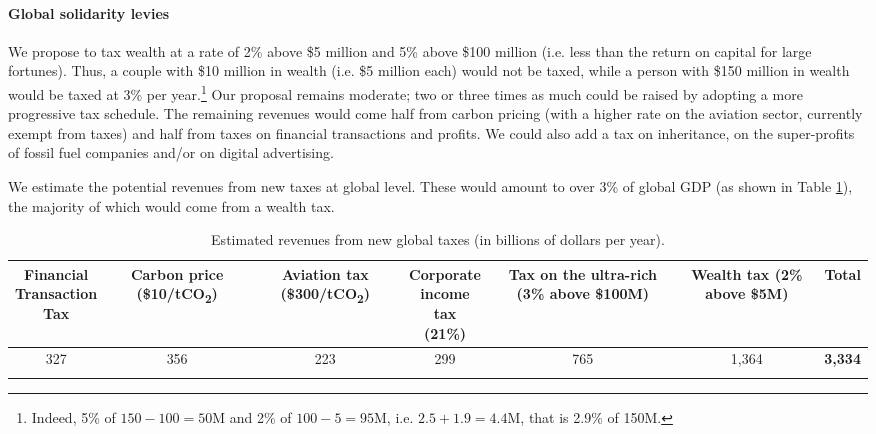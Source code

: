 \documentclass[12pt,english]{article}
\newcommand{\bo}[1]{\textbf{#1}}
\begin{document}
\paragraph{Global solidarity levies}
We propose to tax wealth at a rate of 2\% above \$5 million and 5\% above \$100 million (i.e. less than the return on capital for large fortunes). Thus, a couple with \$10 million in wealth (i.e. \$5 million each) would not be taxed, while a person with \$150 million in wealth would be taxed at 3\% per year.\footnote{Indeed, 5\% of $150 - 100 = 50$M and 2\% of $100 - 5 = 95$M, i.e. $2.5 + 1.9 = 4.4$M, that is 2.9\% of 150M.} 
Our proposal remains moderate; two or three times as much could be raised by adopting a more progressive tax schedule. The remaining revenues would come half from carbon pricing (with a higher rate on the aviation sector, currently exempt from taxes) and half from taxes on financial transactions and profits. 
We could also add a tax on inheritance, on the super-profits of fossil fuel companies and/or on digital advertising.\cite{acemoglu_urgent_2024} 

We estimate the potential revenues from new taxes at global level.\cite{fabre_shared_2024} These would amount to over 3\% of global GDP (as shown in Table \ref{tab:su}), the majority of which would come from a wealth tax. %


\begin{table}[h!]
  \centering 
  \caption{Estimated revenues from new global taxes (in billions of dollars per year).\label{tab:su}}
  \begin{tabular}[t]{ccccccc}
  \toprule
  \makecell{Financial\\Transaction\\Tax} & \makecell{Carbon\\price\\(\$10/tCO\textsubscript{2})} & \makecell{Aviation\\tax\\(\$300/tCO\textsubscript{2})} & \makecell{Corporate\\income tax\\(21\%)} & \makecell{Tax on the\\ultra-rich\\(3\% above\\ \$100M)} & \makecell{Wealth tax\\(2\% above\\ \$5M)} & \bo{Total} \\
  \midrule
  327 & 356 & 223 & 299 & 765 & 1,364 & \bo{3,334} \\
  \bottomrule\\[-0.81em]
  \end{tabular}
\end{table}
\end{document}
